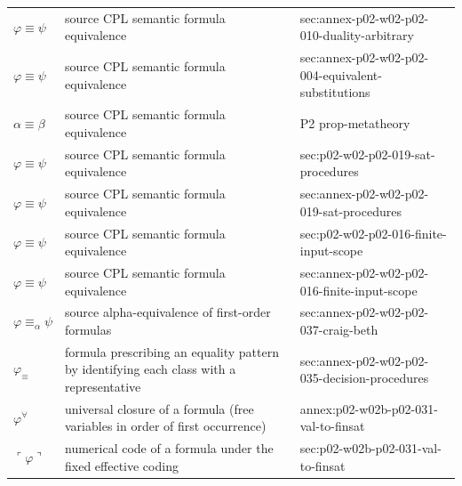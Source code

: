 \begin{longtable}{@{}p{}p{}p{}@{}}
\(\varphi\equiv\psi\) & source CPL semantic formula equivalence & sec:\allowbreak{}annex-\allowbreak{}p02-\allowbreak{}w02-\allowbreak{}p02-\allowbreak{}010-\allowbreak{}duality-\allowbreak{}arbitrary \\
\(\varphi\equiv\psi\) & source CPL semantic formula equivalence & sec:\allowbreak{}annex-\allowbreak{}p02-\allowbreak{}w02-\allowbreak{}p02-\allowbreak{}004-\allowbreak{}equivalent-\allowbreak{}substitutions \\
\(\alpha\equiv\beta\) & source CPL semantic formula equivalence & P2 prop-\allowbreak{}metatheory \\
\(\varphi\equiv\psi\) & source CPL semantic formula equivalence & sec:\allowbreak{}p02-\allowbreak{}w02-\allowbreak{}p02-\allowbreak{}019-\allowbreak{}sat-\allowbreak{}procedures \\
\(\varphi\equiv\psi\) & source CPL semantic formula equivalence & sec:\allowbreak{}annex-\allowbreak{}p02-\allowbreak{}w02-\allowbreak{}p02-\allowbreak{}019-\allowbreak{}sat-\allowbreak{}procedures \\
\(\varphi\equiv\psi\) & source CPL semantic formula equivalence & sec:\allowbreak{}p02-\allowbreak{}w02-\allowbreak{}p02-\allowbreak{}016-\allowbreak{}finite-\allowbreak{}input-\allowbreak{}scope \\
\(\varphi\equiv\psi\) & source CPL semantic formula equivalence & sec:\allowbreak{}annex-\allowbreak{}p02-\allowbreak{}w02-\allowbreak{}p02-\allowbreak{}016-\allowbreak{}finite-\allowbreak{}input-\allowbreak{}scope \\
\(\varphi\equiv_\alpha\psi\) & source alpha-equivalence of first-order formulas & sec:\allowbreak{}annex-\allowbreak{}p02-\allowbreak{}w02-\allowbreak{}p02-\allowbreak{}037-\allowbreak{}craig-\allowbreak{}beth \\
\(\varphi_\equiv\) & formula prescribing an equality pattern by identifying each class with a representative & sec:\allowbreak{}annex-\allowbreak{}p02-\allowbreak{}w02-\allowbreak{}p02-\allowbreak{}035-\allowbreak{}decision-\allowbreak{}procedures \\
\(\varphi^{\forall}\) & universal closure of a formula (free variables in order of first occurrence) & annex:\allowbreak{}p02-\allowbreak{}w02b-\allowbreak{}p02-\allowbreak{}031-\allowbreak{}val-\allowbreak{}to-\allowbreak{}finsat \\
\(\ulcorner\varphi\urcorner\) & numerical code of a formula under the fixed effective coding & sec:\allowbreak{}p02-\allowbreak{}w02b-\allowbreak{}p02-\allowbreak{}031-\allowbreak{}val-\allowbreak{}to-\allowbreak{}finsat \\

\end{longtable}
